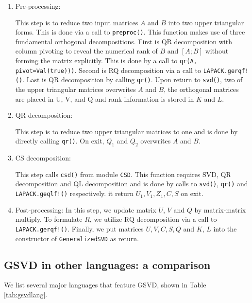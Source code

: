 \begin{enumerate}
    \item Pre-processing:
    
    This step is to reduce two input matrices $A$ and $B$ into two upper triangular forms. This is done via a call to \texttt{preproc()}. This function makes use of three fundamental orthogonal decompositions. First is QR decomposition with column pivoting to reveal the numerical rank of $B$ and $[A; B]$ without forming the matrix explicitly. This is done by a call to \texttt{qr(A, pivot=Val(true)))}. Second is RQ decomposition via a call to \texttt{LAPACK.gerqf!()}. Last is QR decomposition by calling \texttt{qr()}. Upon return to \texttt{svd()}, two of the upper triangular matrices overwrites $A$ and $B$, the orthogonal matrices are placed in U, V, and Q and rank information is stored in $K$ and $L$.
    \item QR decomposition:
    
    This step is to reduce two upper triangular matrices to one and is done by directly calling \texttt{qr()}. On exit, $Q_1$ and $Q_2$ overwrites $A$ and $B$.  
    
    \item CS decomposition:
    
    This step calls \texttt{csd()} from module \texttt{CSD}. This function requires SVD, QR decomposition and QL decomposition and is done by calls to \texttt{svd()}, \texttt{qr()} and \texttt{LAPACK.geqlf!()} respectively. it return $U_1, V_1, Z_1, C, S$ on exit.   
    
    \item Post-processing:
    In this step, we update matrix $U$, $V$ and $Q$ by matrix-matrix multiply. To formulate $R$, we utilize RQ decomposition via a call to \texttt{LAPACK.gerqf!()}. Finally, we put matrices $U, V, C, S, Q$ and $K$, $L$ into the constructor of \texttt{GeneralizedSVD} as return. 
\end{enumerate}

\subsection{GSVD in other languages: a comparison}
    We list several major languages that feature GSVD, shown in Table \ref{tab:gsvdlang}.
    

